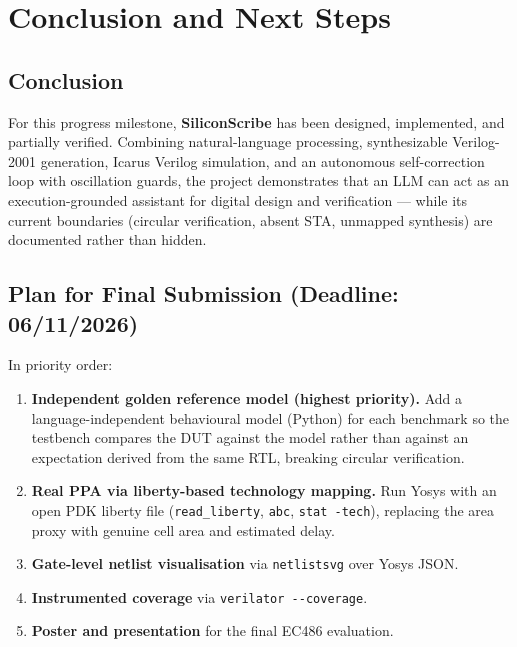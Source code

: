 \documentclass[11pt,a4paper]{article}
\begin{document}
\section{Conclusion and Next Steps}

\subsection{Conclusion}
For this progress milestone, \textbf{SiliconScribe} has been designed,
implemented, and partially verified. Combining natural-language processing,
synthesizable Verilog-2001 generation, Icarus Verilog simulation, and an autonomous
self-correction loop with oscillation guards, the project demonstrates that an LLM
can act as an execution-grounded assistant for digital design and verification ---
while its current boundaries (circular verification, absent STA, unmapped
synthesis) are documented rather than hidden.

\subsection{Plan for Final Submission (Deadline: 06/11/2026)}
In priority order:
\begin{enumerate}[label=\textbf{\arabic*.}]
\item \textbf{Independent golden reference model (highest priority).} Add a
language-independent behavioural model (Python) for each benchmark so the testbench
compares the DUT against the model rather than against an expectation derived from
the same RTL, breaking circular verification.
\item \textbf{Real PPA via liberty-based technology mapping.} Run Yosys with an
open PDK liberty file (\texttt{read\_liberty}, \texttt{abc}, \texttt{stat -tech}),
replacing the area proxy with genuine cell area and estimated delay.
\item \textbf{Gate-level netlist visualisation} via \texttt{netlistsvg} over Yosys
JSON.
\item \textbf{Instrumented coverage} via \texttt{verilator {-}{-}coverage}.
\item \textbf{Poster and presentation} for the final EC486 evaluation.
\end{enumerate}

\end{document}

